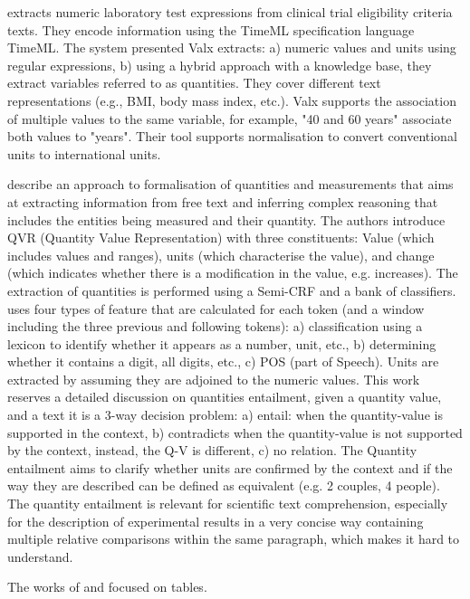 \cite{hao2016} extracts numeric laboratory test expressions from clinical trial eligibility criteria texts. 
They encode information using the TimeML specification language TimeML. The system presented Valx extracts: a) numeric values and units using regular expressions, b) using a hybrid approach with a knowledge base, they extract variables referred to as quantities. They cover different text representations (e.g., BMI, body mass index, etc.). Valx supports the association of multiple values to the same variable, for example, "40 and 60 years" associate both values to "years". Their tool supports normalisation to convert conventional units to international units. 

\cite{roy2015reasoning} describe an approach to formalisation of quantities and measurements that aims at extracting information from free text and inferring complex reasoning that includes the entities being measured and their quantity. 
The authors introduce QVR (Quantity Value Representation) with three constituents: Value (which includes values and ranges), units (which characterise the value), and change (which indicates whether there is a modification in the value, e.g. increases). 
The extraction of quantities is performed using a Semi-CRF and a bank of classifiers. 
\cite{roy2015reasoning} uses four types of feature that are calculated for each token (and a window including the three previous and following tokens): a) classification using a lexicon to identify whether it appears as a number, unit, etc., b) determining whether it contains a digit, all digits, etc., c) POS (part of Speech). Units are extracted by assuming they are adjoined to the numeric values. 
This work reserves a detailed discussion on quantities entailment, given a quantity value, and a text it is a 3-way decision problem: a) entail: when the quantity-value is supported in the context, b) contradicts when the quantity-value is not supported by the context, instead, the Q-V is different, c) no relation. 
The Quantity entailment aims to clarify whether units are confirmed by the context and if the way they are described can be defined as equivalent (e.g. 2 couples, 4 people). The quantity entailment is relevant for scientific text comprehension, especially for the description of experimental results in a very concise way containing multiple relative comparisons within the same paragraph, which makes it hard to understand. 

The works of \cite{taha2021identifying} and \cite{ho2021qute} focused on tables.

